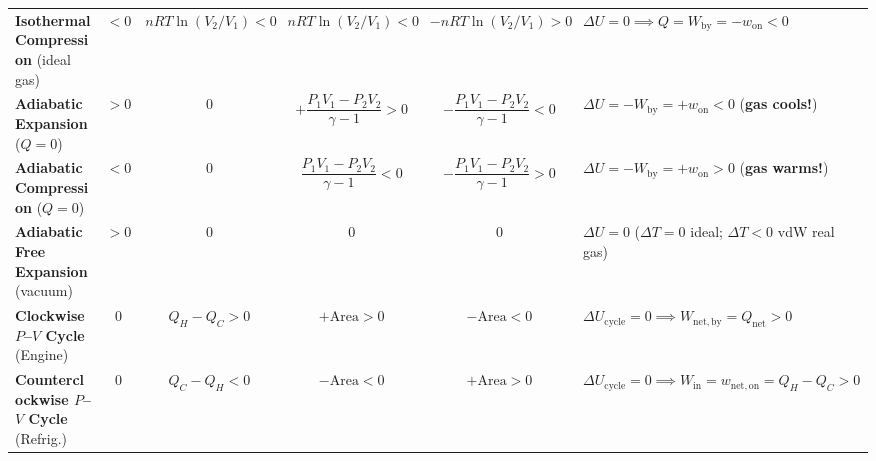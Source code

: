 \begin{formulacard}
\begin{tabularx}{\linewidth}{@{}l c c c c X@{}}
\textbf{Isothermal Compression} (ideal gas) & $<0$ & $nRT\ln(V_2/V_1)<0$ & $nRT\ln(V_2/V_1)<0$ & $-nRT\ln(V_2/V_1)>0$ & $\Delta U = 0 \implies Q = W_{\mathrm{by}} = -w_{\mathrm{on}} < 0$ \\
\textbf{Adiabatic Expansion} ($Q=0$) & $>0$ & $0$ & $+\dfrac{P_1V_1-P_2V_2}{\gamma-1}>0$ & $-\dfrac{P_1V_1-P_2V_2}{\gamma-1}<0$ & $\Delta U = -W_{\mathrm{by}} = +w_{\mathrm{on}} < 0$ (\textbf{gas cools!}) \\
\textbf{Adiabatic Compression} ($Q=0$) & $<0$ & $0$ & $\dfrac{P_1V_1-P_2V_2}{\gamma-1}<0$ & $-\dfrac{P_1V_1-P_2V_2}{\gamma-1}>0$ & $\Delta U = -W_{\mathrm{by}} = +w_{\mathrm{on}} > 0$ (\textbf{gas warms!}) \\
\textbf{Adiabatic Free Expansion} (vacuum) & $>0$ & $0$ & $0$ & $0$ & $\Delta U = 0$ ($\Delta T = 0$ ideal; $\Delta T < 0$ vdW real gas) \\
\textbf{Clockwise $P$--$V$ Cycle} (Engine) & $0$ & $Q_H - Q_C > 0$ & $+\mathrm{Area} > 0$ & $-\mathrm{Area} < 0$ & $\Delta U_{\mathrm{cycle}} = 0 \implies W_{\mathrm{net,by}} = Q_{\mathrm{net}} > 0$ \\
\textbf{Counterclockwise $P$--$V$ Cycle} (Refrig.) & $0$ & $Q_C - Q_H < 0$ & $-\mathrm{Area} < 0$ & $+\mathrm{Area} > 0$ & $\Delta U_{\mathrm{cycle}} = 0 \implies W_{\mathrm{in}} = w_{\mathrm{net,on}} = Q_H - Q_C > 0$ \\
\bottomrule
\end{tabularx}
\end{formulacard}

